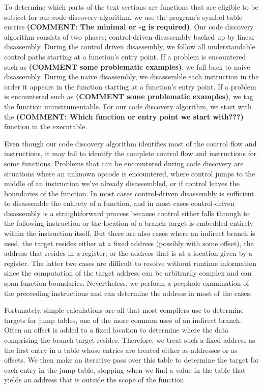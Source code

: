 To determine which parts of the text sections are functions that are eligible to be subject for our code discovery algorithm, 
we use the program's symbol table entries \textbf{(COMMENT: The minimal or -g is required)}. Our code discovery algorithm
consists of two phases; control-driven disassembly backed up by linear disassembly. During the control driven disassembly, 
we follow all understandable control paths starting at a function's entry point. If a problem is encountered such as 
\textbf{(COMMENT some problematic examples)}, 
we fall back to naive disassembly. During the naive disassembly, we disassemble each instruction in the order it appears in the
function starting at a function's entry point. If a problem is encountered such as \textbf{(COMMENT some problematic examples)}, 
we tag the function uninstrumentable. For our code discovery algorithm, we start with the 
\textbf{(COMMENT: Which function or entry point we start with???)} function in the executable. 

Even though our code discovery algorithm identifies most of the control flow and instructions, it may fail to 
identify the complete control flow and instructions for some functions.  Problems that can be encountered during code discovery
are situations where an unknown opcode is encountered, where control jumps to the
middle of an instruction we've already disassembled, or if control leaves the boundaries of the function. In most
cases control-driven disassembly is sufficient to disassemble the entirety of a function, and in most cases control-driven
disassembly is a straightforward process because control either falls through to the following instruction 
or the location of a branch target is embedded entirely within the instruction itself. But there are also cases
where an indirect branch is used, the target resides either at a fixed address (possibly with some offset),
the address that resides in a register, or the address that is at a location given by a register. The latter two cases are difficult to resolve
without runtime information since the computation of the target address can be arbitrarily complex and can span function
boundaries. Nevertheless, we perform a peephole examination of the preceeding instructions and can determine 
the address in most of the cases.

Fortunately, simple calculations are all that most compilers use to determine targets for jump tables, one of the more common
uses of an indirect branch. Often an offset is added to a fixed location to determine where the data comprising the branch target
resides. Therefore, we treat such a fixed address as the first entry in a table whose entries are treated either as addresses or as offsets.
We then make an iterative pass over this table to determine the target for each entry in the jump table, stopping when we find a value in the
table that yields an address that is outside the scope of the function.

